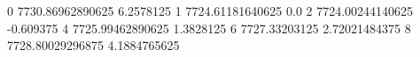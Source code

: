 0 7730.86962890625 6.2578125
1 7724.61181640625 0.0
2 7724.00244140625 -0.609375
4 7725.99462890625 1.3828125
6 7727.33203125 2.72021484375
8 7728.80029296875 4.1884765625
